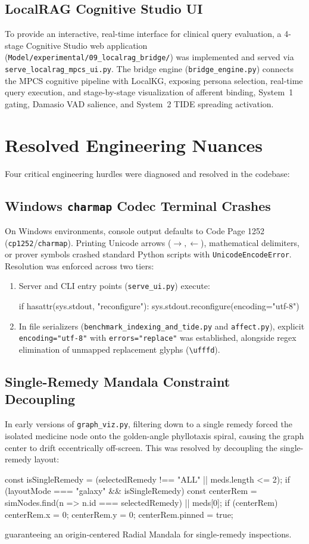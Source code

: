 \documentclass[10pt,twocolumn,letterpaper]{article}
\begin{document}
\subsection{LocalRAG Cognitive Studio UI}
To provide an interactive, real-time interface for clinical query evaluation, a 4-stage Cognitive Studio web application (\nolinkurl{Model/experimental/09_localrag_bridge/}) was implemented and served via \nolinkurl{serve_localrag_mpcs_ui.py}. The bridge engine (\texttt{bridge\_engine.py}) connects the MPCS cognitive pipeline with LocalKG, exposing persona selection, real-time query execution, and stage-by-stage visualization of afferent binding, System~1 gating, Damasio VAD salience, and System~2 TIDE spreading activation.

\section{Resolved Engineering Nuances}
Four critical engineering hurdles were diagnosed and resolved in the codebase:

\subsection{Windows \texttt{charmap} Codec Terminal Crashes}
On Windows environments, console output defaults to Code Page 1252 (\texttt{cp1252}/\texttt{charmap}). Printing Unicode arrows ($\rightarrow, \leftarrow$), mathematical delimiters, or prover symbols crashed standard Python scripts with \texttt{UnicodeEncodeError}.
Resolution was enforced across two tiers:
\begin{enumerate}
  \item Server and CLI entry points (\texttt{serve\_ui.py}) execute:
  \begin{codeblock}
if hasattr(sys.stdout, "reconfigure"):
    sys.stdout.reconfigure(encoding="utf-8")
  \end{codeblock}
  \item In file serializers (\nolinkurl{benchmark_indexing_and_tide.py} and \texttt{affect.py}), explicit \texttt{encoding="utf-8"} with \texttt{errors="replace"} was established, alongside regex elimination of unmapped replacement glyphs (\texttt{\textbackslash ufffd}).
\end{enumerate}

\subsection{Single-Remedy Mandala Constraint Decoupling}
In early versions of \texttt{graph\_viz.py}, filtering down to a single remedy forced the isolated medicine node onto the golden-angle phyllotaxis spiral, causing the graph center to drift eccentrically off-screen.
This was resolved by decoupling the single-remedy layout:
\begin{codeblock}
const isSingleRemedy = (selectedRemedy !== "ALL" || meds.length <= 2);
if (layoutMode === "galaxy" && isSingleRemedy) {
  const centerRem = simNodes.find(n => n.id === selectedRemedy) || meds[0];
  if (centerRem) { centerRem.x = 0; centerRem.y = 0; centerRem.pinned = true; }
}
\end{codeblock}
guaranteeing an origin-centered Radial Mandala for single-remedy inspections.
\end{document}
